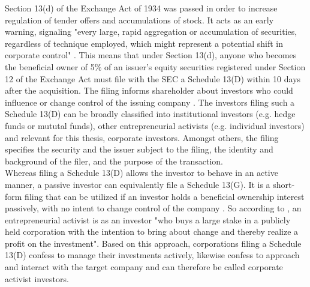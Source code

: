 \documentclass[12pt]{article}
\begin{document}
Section 13(d) of the Exchange Act of 1934 was passed in order to increase regulation of tender offers and accumulations of stock.
It acts as an early warning, signaling "every large, rapid aggregation or accumulation of securities, regardless of technique employed, which might represent a potential shift in corporate control" \citep[p.2]{Morrison2015}. 
This means that under Section 13(d), anyone who becomes the beneficial owner of 5\% of an issuer's equity securities registered under Section 12 of the Exchange Act must file with the SEC a Schedule 13(D) within 10 days after the acquisition. The filing informs shareholder about investors who could influence or change control of the issuing company \citep[p.110]{Giglia2016}. The investors filing such a Schedule 13(D) can be broadly classified into institutional investors (e.g. hedge funds or mututal funds), other entrepreneurial activists (e.g. individual investors) \citep[p.188]{Klein2009} and relevant for this thesis, corporate investors. Amongst others, the filing specifies the security and the issuer subject to the filing, the identity and background of the filer, and the purpose of the transaction.\\
Whereas filing a Schedule 13(D) allows the investor to behave in an active manner, a passive investor can equivalently file a Schedule 13(G). It is a short-form filing that can be utilized if an investor holds a beneficial ownership interest passively, with no intent to change control of the company \citep{Giglia2016}. So according to \citet[p.187]{Klein2009}, an entrepreneurial activist is as an investor "who buys a large stake in a publicly held corporation with the intention to bring about change and thereby realize a profit on the investment". Based on this approach, corporations filing a Schedule 13(D) confess to manage their investments actively, likewise confess to approach and interact with the target company and can therefore be called corporate activist investors. 
\end{document}
